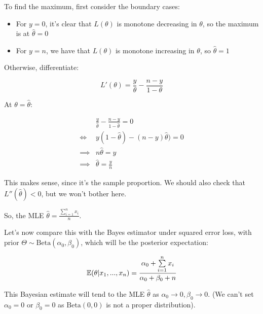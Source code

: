 \documentclass[a4paper]{article}
\begin{document}
            To find the maximum, first consider the boundary cases:

            \begin{itemize}
                \item For $y = 0$, it's clear that $L(\theta)$ is monotone
                    decreasing in $\theta$, so the maximum is at $\widehat
                    \theta = 0$
                \item For $y = n$, we have that $L(\theta)$ is monotone
                    increasing in $\theta$, so $\widehat \theta = 1$
            \end{itemize}

            Otherwise, differentiate:

            \[
                L'(\theta) = \frac{y}{\theta} - \frac{n - y}{1 - \theta}
            \]

            At $\theta = \widehat \theta$:

            \begin{align*}
                & \frac{y}{\widehat \theta} - \frac{n - y}{1 - \widehat \theta}
                    = 0 \\
                \iff & y(1 - \widehat \theta) - (n - y)\widehat \theta) = 0 \\
                \implies & n\widehat \theta = y \\
                \implies & \widehat \theta = \frac{y}{n}
            \end{align*}

            This makes sense, since it's the sample proportion. We should also
            check that $L''(\widehat \theta) < 0$, but we won't bother here.

            So, the MLE $\widehat \theta = \frac{\sum\limits_{i=1}^n x_i}{n}$.

            Let's now compare this with the Bayes estimator under squared error
            loss, with prior $\Theta \sim \text{Beta}(\alpha_0, \beta_0)$, which
            will be the posterior expectation:

            \[
                \mathbb{E}(\theta | x_1, ..., x_n) = \frac{\alpha_0 +
                \sum\limits_{i=1}^n x_i}{\alpha_0 + \beta_0 + n}
            \]

            This Bayesian estimate will tend to the MLE $\widehat \theta$ as
            $\alpha_0 \to 0, \beta_0 \to 0$. (We can't set $\alpha_0 = 0$ or
            $\beta_0 = 0$ as $\text{Beta}(0, 0)$ is not a proper distribution).
\end{document}
